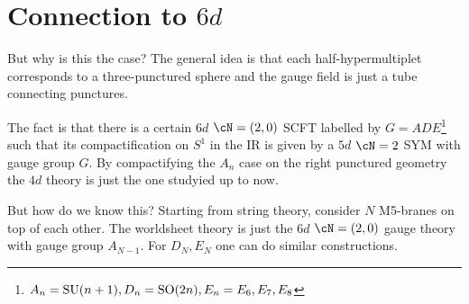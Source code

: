 \section{\texorpdfstring{Connection to $6d$}{M-theory}}
But why is this the case? The general idea is that each half-hypermultiplet corresponds to a three-punctured sphere and the gauge field is just a tube connecting punctures. 

The fact is that there is a certain $6d$ $\cN=(2,0)$ SCFT labelled by $G=ADE$\footnote{$A_n=\mathrm{SU}(n+1),D_n=\mathrm{SO}(2n),E_n=E_6,E_7,E_8$} such that its compactification on $S^1$ in the IR is given by a $5d$ $\cN=2$ SYM with gauge group $G$. By compactifying the $A_n$ case on the right punctured geometry the $4d$ theory is just the one studyied up to now.

But how do we know this? Starting from string theory, consider $N$ M5-branes on top of each other. The worldsheet theory is just the $6d$ $\cN=(2,0)$ gauge theory with gauge group $A_{N-1}$. For $D_N,E_N$ one can do similar constructions.
